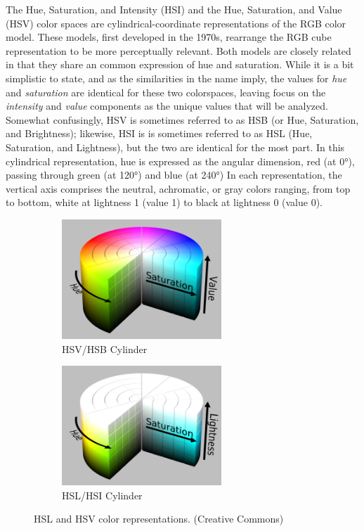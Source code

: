 \documentclass[letterpaper]{article}
\begin{document}
{The Hue, Saturation, and Intensity (HSI) and the Hue, Saturation, and Value (HSV) color spaces are cylindrical-coordinate representations of the RGB color model.  These models, first developed in the 1970s, rearrange the RGB cube representation to be more perceptually relevant. Both models are closely related in that they share an common expression of hue and saturation. While it is a bit simplistic to state, and as the similarities in the name imply, the values for \textit{hue} and \textit{saturation} are identical for these two colorspaces, leaving focus on the \textit{intensity} and \textit{value} components as the unique values that will be analyzed. \parencite[p.~84]{Forsyth2012-hy} Somewhat confusingly, HSV is sometimes referred to as HSB (or Hue, Saturation, and Brightness); likewise, HSI is  is sometimes referred to as HSL (Hue, Saturation, and Lightness), but the two are identical for the most part. In this cylindrical representation, hue is expressed as the angular dimension, red (at 0\si{\degree}), passing through green (at 120\si{\degree}) and blue (at 240\si{\degree}) In each representation, the vertical axis comprises the neutral, achromatic, or gray colors ranging, from top to bottom, white at lightness 1 (value 1) to black at lightness 0 (value 0).

\begin{figure}[H]
	\centering
	\begin{subfigure}[h]{.45\textwidth}
		\centering
		\includegraphics[width=6cm]{./figures/HSV_color_solid_cylinder_saturation_gray.png}
		\caption{HSV/HSB Cylinder}
		\label{fig:hsv}
	\end{subfigure}
	\hfill
	\begin{subfigure}[h]{.45\textwidth}
		\centering
		\includegraphics[width=6cm]{./figures/HSL_color_solid_cylinder_saturation_gray.png}
		\caption{HSL/HSI Cylinder}
		\label{fig:hsl}
	\end{subfigure}
	\caption[HSL and HSV color representations]{HSL and HSV color representations. (Creative Commons)}
	\label{fig:overlap}
\end{figure}

}
\end{document}
